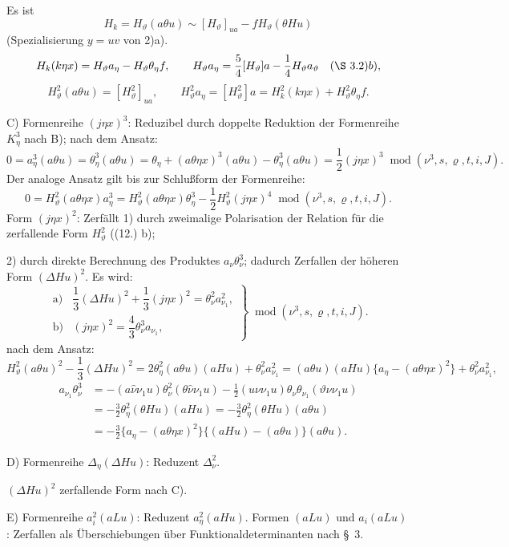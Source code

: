 \documentclass[11pt]{article}
\newcommand{\A}{\Delta}
\newcommand{\R}{\varrho}
\newcommand{\modu}[1]{\;\operatorname{mod} #1}
\providecommand{\modu}[1]{\;\operatorname{mod} #1}
\begin{document}
Es ist
\[
H_k=H_\vartheta(a\theta u)\sim [H_\vartheta]_{ua}-fH_\vartheta(\theta Hu)
\]
(Spezialisierung $y=uv$ von 2)a).
\[
H_k(k\eta x)=H_\vartheta a_\eta-H_\vartheta\theta_\eta f,
\qquad
H_\vartheta a_\eta=\frac54[H_\vartheta]a-\frac14H_\vartheta a_\vartheta
\quad(\S\ 3. 2)b),
\]
\[
H_\vartheta^2(a\theta u)=[H_\vartheta^2]_{ua},
\qquad
H_\vartheta^2a_\eta=[H_\vartheta^2]a=H_k^2(k\eta x)+H_\vartheta^2\theta_\eta f.
\]

\noindent C) Formenreihe $(j\eta x)^3$: Reduzibel durch doppelte Reduktion der Formenreihe $K_\eta^3$ nach B); nach dem Ansatz:
\[
0=a_\eta^3(a\theta u)=\theta_\eta^3(a\theta u)
=\theta_\eta+(a\theta\eta x)^3(a\theta u)-\theta_\eta^3(a\theta u)
=\frac12(j\eta x)^3\modu{(\nu^3,s,\R,t,i,J)}.
\]
Der analoge Ansatz gilt bis zur Schlußform der Formenreihe:
\[
0=H_\vartheta^2(a\theta\eta x)a_\eta^3
=H_\vartheta^2(a\theta\eta x)\theta_\eta^3
-\frac12H_\vartheta^2(j\eta x)^4\modu{(\nu^3,s,\R,t,i,J)}.
\]
Form $(j\eta x)^2$: Zerfällt 1) durch zweimalige Polarisation der Relation für die zerfallende Form $H_\vartheta^2$ ((12.) b);

2) durch direkte Berechnung des Produktes $a_\nu\theta_\nu^3$; dadurch Zerfallen der höheren Form $(\A Hu)^2$. Es wird:
\[
\tag{18}
\left.\begin{array}{ll}
\text{a)}&\dfrac13(\A Hu)^2+\dfrac13(j\eta x)^2=\theta_\nu^2a_{\nu_1}^2,\\[0.6em]
\text{b)}&(j\eta x)^2=\dfrac43\theta_\nu^3a_{\nu_1},
\end{array}\right\}\modu{(\nu^3,s,\R,t,i,J)}.
\]
nach dem Ansatz:
\[
H_\vartheta^2(a\theta u)^2-\frac13(\A Hu)^2
=2\theta_\eta^2(a\theta u)(aHu)+\theta_\nu^2a_{\nu_1}^2
=(a\theta u)(aHu)\{a_\eta-(a\theta\eta x)^2\}+\theta_\nu^2a_{\nu_1}^2,
\]
\[
\begin{aligned}
a_{\nu_1}\theta_\nu^3
&=-(a\widehat{\nu}\nu_1u)\theta_\nu^2(\theta\widehat{\nu}\nu_1u)
-\frac12(u\nu\nu_1u)\theta_\nu\theta_{\nu_1}(\vartheta\nu\nu_1u)\\
&=-\frac32\theta_\eta^2(\theta Hu)(aHu)
=-\frac32\theta_\eta^2(\theta Hu)(a\theta u)\\
&=-\frac32\{a_\eta-(a\theta\eta x)^2\}\{(aHu)-(a\theta u)\}(a\theta u).
\end{aligned}
\]

\noindent D) Formenreihe $\A_\eta(\A Hu)$: Reduzent $\A_\nu^2$.

$(\A Hu)^2$ zerfallende Form nach C).

\noindent E) Formenreihe $a_i^2(aLu)$: Reduzent $a_\eta^2(aHu)$. Formen $(aLu)$ und $a_i(aLu)$: Zerfallen als Überschiebungen über Funktionaldeterminanten nach \S\ 3.
\end{document}
